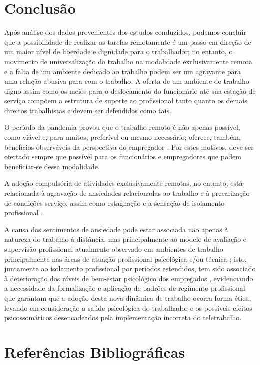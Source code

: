 \documentclass[12pt]{article}
\begin{document}
\section{Conclusão}

Após análise dos dados provenientes dos estudos conduzidos, podemos concluir que a possibilidade de realizar as tarefas
remotamente é um passo em direção de um maior nível de liberdade e dignidade para o trabalhador; no entanto, o
movimento de universalização do trabalho na modalidade exclusivamente remota e a falta de um
ambiente dedicado ao trabalho podem ser um agravante para uma relação abusiva para com o trabalho. A oferta de um ambiente
de trabalho digno assim como os meios para o deslocamento do funcionário até sua estação de serviço compõem a estrutura
de suporte ao profissional tanto quanto os demais direitos trabalhistas e devem ser defendidos como tais. 

O período da pandemia provou que o trabalho remoto é não apenas possível, como viável e, para muitos, preferível ou
mesmo necessário; oferece, também, benefícios observáveis da perspectiva do empregador \cite{sustainability2022}.
Por estes motivos, deve ser ofertado sempre que possível para os funcionários e empregadores que podem beneficiar-se
dessa modalidade. 

A adoção compulsória de atividades exclusivamente remotas, no entanto, está relacionada à agravação de ansiedades
relacionadas ao trabalho e à precarização de condições serviço, assim como estagnação e a sensação de
isolamento profissional \cite{ijerph2021,forbes2023}.

A causa dos sentimentos de ansiedade pode estar associada não apenas à natureza do trabalho à distância, mas principalmente
ao modelo de avaliação e supervisão profissional atualmente observado em ambientes de trabalho principalmente nas áreas
de atuação profissional psicológica e/ou técnica \cite{trinkenreichorganization}; isto, juntamente ao isolamento profissional
por períodos estendidos, tem sido associado à deterioração dos níveis de bem-estar psicológico dos empregados
\cite{tulili2023burnout}, evidenciando a necessidade da formalização e aplicação de  padrões de regimento profissional
que garantam que a adoção desta nova dinâmica de trabalho ocorra forma ética, levando em consideração a saúde
psicológica do trabalhador e os possíveis efeitos psicossomáticos desencadeados pela implementação incorreta do
\gls{teletrabalho}.

\newpage
\section{Referências Bibliográficas}


\end{document}
